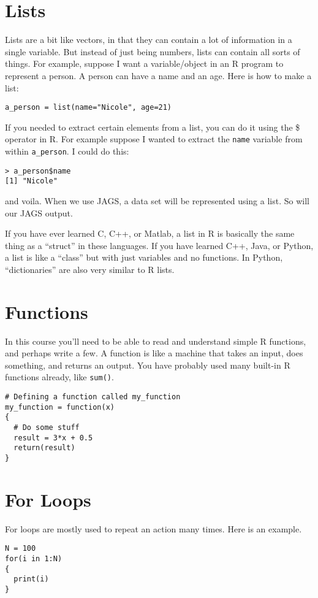 \section{Lists}
Lists are a bit like vectors, in that they can contain a lot of information in
a single variable. But instead of just being numbers, lists can contain all
sorts of things. For example, suppose I want a variable/object in an R program
to represent a person. A person can have a name and an age. Here is how to make
a list:
\begin{verbatim}
a_person = list(name="Nicole", age=21)
\end{verbatim}
If you needed to extract certain elements from a list, you can do it using the
\$ operator in R. For example suppose I wanted to extract the {\tt name} variable
from within {\tt a\_person}. I could do this:
\begin{verbatim}
> a_person$name
[1] "Nicole"
\end{verbatim}
and voila. When we use JAGS, a data set will be represented using a list.
So will our JAGS output.

If you have ever learned C, C++, or Matlab, a list in R is basically the same thing as
a ``struct'' in these languages.
If you have learned C++, Java, or Python, a list is
like a ``class'' but with just variables and no functions.
In Python, ``dictionaries''
are also very similar to R lists.

\section{Functions}
In this course you'll need to be able to read and understand simple R
functions, and perhaps write a few. A function is like a machine that takes
an input, does something, and returns an output. You have probably used many
built-in R functions already, like {\tt sum()}.

\begin{verbatim}
# Defining a function called my_function
my_function = function(x)
{
  # Do some stuff
  result = 3*x + 0.5
  return(result)
}
\end{verbatim}


\section{For Loops}
For loops are mostly used to repeat an action many times. Here is an example.
\begin{verbatim}
N = 100
for(i in 1:N)
{
  print(i)
}
\end{verbatim}

